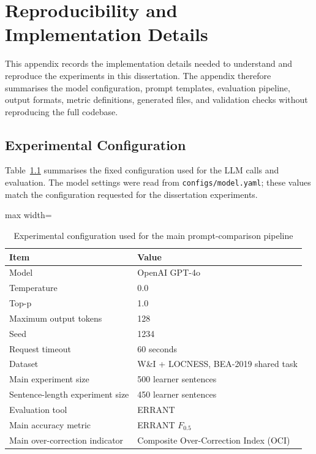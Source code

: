 \chapter{Reproducibility and Implementation Details}
\label{app:reproducibility}

This appendix records the implementation details needed to understand and reproduce the experiments in this dissertation. The appendix therefore summarises the model configuration, prompt templates, evaluation pipeline, output formats, metric definitions, generated files, and validation checks without reproducing the full codebase.

\section{Experimental Configuration}
\label{app:experimental-configuration}

Table~\ref{tab:appendix_config} summarises the fixed configuration used for the LLM calls and evaluation. The model settings were read from \texttt{configs/model.yaml}; these values match the configuration requested for the dissertation experiments.

\begin{table}[htbp]
    \centering
    \caption{Experimental configuration used for the main prompt-comparison pipeline}
    \label{tab:appendix_config}
    \renewcommand{\arraystretch}{1.15}
    \begin{adjustbox}{max width=\textwidth}
    \begin{tabular}{ll}
        \toprule
        \textbf{Item} & \textbf{Value} \\
        \midrule
        Model & OpenAI GPT-4o \\
        Temperature & 0.0 \\
        Top-p & 1.0 \\
        Maximum output tokens & 128 \\
        Seed & 1234 \\
        Request timeout & 60 seconds \\
        Dataset & W\&I + LOCNESS, BEA-2019 shared task \\
        Main experiment size & 500 learner sentences \\
        Sentence-length experiment size & 450 learner sentences \\
        Evaluation tool & ERRANT \\
        Main accuracy metric & ERRANT $F_{0.5}$ \\
        Main over-correction indicator & Composite Over-Correction Index (OCI) \\
        \bottomrule
    \end{tabular}
    \end{adjustbox}
\end{table}

